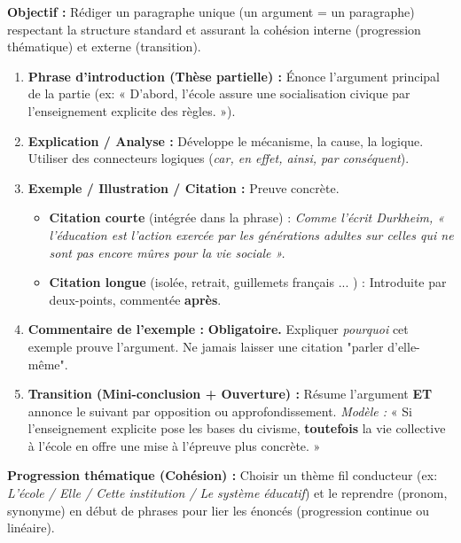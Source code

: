 \documentclass[11pt]{article}
\newcommand{\cle}[1]{{\popxbold\color{popdark}#1}}
\begin{document}
\begin{methode}
    \textbf{Objectif :} Rédiger un paragraphe unique (un argument = un paragraphe) respectant la structure standard et assurant la cohésion interne (progression thématique) et externe (transition).
    \begin{enumerate}
        \item \textbf{Phrase d'introduction (Thèse partielle) :} Énonce l'argument principal de la partie (ex: « D'abord, l'école assure une socialisation civique par l'enseignement explicite des règles. »).
        \item \textbf{Explication / Analyse :} Développe le mécanisme, la cause, la logique. Utiliser des connecteurs logiques (\emph{car, en effet, ainsi, par conséquent}).
        \item \textbf{Exemple / Illustration / Citation :} \cle{Preuve concrète}. 
            \begin{itemize}
                \item \textbf{Citation courte} (intégrée dans la phrase) : \emph{Comme l'écrit Durkheim, « l'éducation est l'action exercée par les générations adultes sur celles qui ne sont pas encore mûres pour la vie sociale ».}
                \item \textbf{Citation longue} (isolée, retrait, guillemets français \og ... \fg{}) : Introduite par deux-points, commentée \textbf{après}.
            \end{itemize}
        \item \textbf{Commentaire de l'exemple :} \textbf{Obligatoire.} Expliquer \emph{pourquoi} cet exemple prouve l'argument. Ne jamais laisser une citation "parler d'elle-même".
        \item \textbf{Transition (Mini-conclusion + Ouverture) :} Résume l'argument \textbf{ET} annonce le suivant par opposition ou approfondissement. \textit{Modèle :} « Si l'enseignement explicite pose les bases du civisme, \textbf{toutefois} la vie collective à l'école en offre une mise à l'épreuve plus concrète. »
    \end{enumerate}
    \textbf{Progression thématique (Cohésion) :} Choisir un thème fil conducteur (ex: \emph{L'école / Elle / Cette institution / Le système éducatif}) et le reprendre (pronom, synonyme) en début de phrases pour lier les énoncés (progression \cle{continue} ou \cle{linéaire}).
\end{methode}
\end{document}
